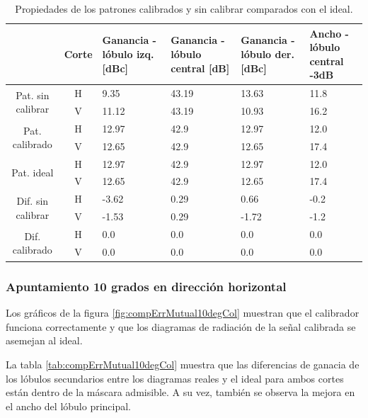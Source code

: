 \begin{table}[H]
  \footnotesize
  \centering
  \begin{tabular}{|c|c|p{2cm}|p{2.5cm}|p{2.5cm}|p{2.5cm}|}
    \cline{2-6}
    \multicolumn{1}{c|}{} & Corte & Ganancia - lóbulo izq. [dBc] & Ganancia - lóbulo central [dB] &
    Ganancia - lóbulo der. [dBc] & Ancho - lóbulo central -3dB \tabularnewline\hline
    \multirow{2}{2cm}{Pat. sin calibrar} & H & 9.35 & 43.19 & 13.63 & 11.8 \tabularnewline\cline{2-6}
     & V & 11.12 & 43.19 & 10.93 & 16.2 \tabularnewline\hline
    \multirow{2}{2cm}{Pat. calibrado} & H & 12.97 & 42.9 & 12.97 & 12.0 \tabularnewline\cline{2-6}
     & V & 12.65 & 42.9 & 12.65 & 17.4 \tabularnewline\hline
    \multirow{2}{2cm}{Pat. ideal} & H & 12.97 & 42.9 & 12.97 & 12.0 \tabularnewline\cline{2-6}
     & V & 12.65 & 42.9 & 12.65 & 17.4 \tabularnewline\hline
    \multirow{2}{2cm}{Dif. sin calibrar} & H & -3.62 & 0.29 & 0.66 & -0.2\tabularnewline\cline{2-6}
     & V & -1.53 & 0.29 & -1.72 & -1.2 \tabularnewline\hline
    \multirow{2}{2cm}{Dif. calibrado} & H & 0.0 & 0.0 & 0.0 & 0.0 \tabularnewline\cline{2-6}
     & V & 0.0 & 0.0 & 0.0 & 0.0 \tabularnewline\hline
  \end{tabular}
  \caption{Propiedades de los patrones calibrados y sin calibrar comparados con el ideal.}
  \label{tab:compErrMutual0deg}
\end{table}


\subsubsection{Apuntamiento 10 grados en dirección horizontal}

Los gráficos de la figura \ref{fig:compErrMutual10degCol} muestran que el calibrador funciona correctamente y que los diagramas de 
radiación de la señal calibrada se asemejan al ideal. 

La tabla \ref{tab:compErrMutual10degCol} muestra que las diferencias de ganacia de los lóbulos secundarios entre los diagramas 
reales y el ideal para ambos cortes están dentro de la máscara admisible. A su vez, también se observa la mejora en el ancho 
del lóbulo principal.

